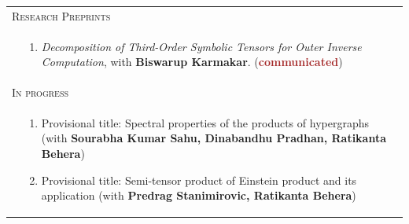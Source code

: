 \documentclass[a4paper,12pt]{article}
\begin{document}
\begin{longtable}{lp{15cm}}
\multicolumn{2}{l}{\textsc{Research Preprints}}\\[0.2cm]
& 
\vspace{-0.5cm}
\begin{enumerate}
\item {\it Decomposition of Third-Order Symbolic Tensors for Outer Inverse Computation}, with {\bf Biswarup Karmakar}. ({\bf \textcolor{brown}{communicated}})
\end{enumerate}\\[0.5cm]
\multicolumn{2}{l}{\textsc{In progress}}\\[0.2cm]
& 
\vspace{-0.5cm}
\begin{enumerate}
\item Provisional title: Spectral properties of the products of hypergraphs (with {\bf Sourabha Kumar Sahu, Dinabandhu Pradhan, Ratikanta Behera})
\item Provisional title: Semi-tensor product of Einstein product and its application (with {\bf Predrag Stanimirovic, Ratikanta Behera})
\end{enumerate}
\end{longtable}
\end{document}
